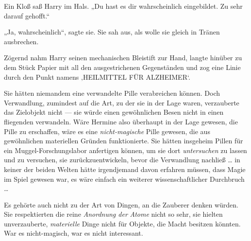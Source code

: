 Ein Kloß saß Harry im Hals.
„Du hast es dir wahrscheinlich eingebildet. Zu sehr darauf gehofft.“

„Ja, wahrscheinlich“, sagte sie. Sie sah aus, als wolle sie gleich in Tränen ausbrechen.

Zögernd nahm Harry seinen mechanischen Bleistift zur Hand, langte hinüber zu dem Stück Papier mit all den ausgestrichenen Gegenständen und zog eine Linie durch den Punkt namens ‚HEILMITTEL FÜR ALZHEIMER‘.

Sie hätten niemandem eine verwandelte Pille verabreichen können. Doch Verwandlung, zumindest auf die Art, zu der sie in der Lage waren, verzauberte das Zielobjekt nicht — sie würde einen gewöhnlichen Besen nicht in einen fliegenden verwandeln. Wäre Hermine also überhaupt in der Lage gewesen, die Pille zu erschaffen, wäre es eine \emph{nicht-magische} Pille gewesen, die aus gewöhnlichen materiellen Gründen funktionierte. Sie hätten insgeheim Pillen für ein Muggel-Forschungslabor anfertigen können, um sie dort \emph{untersuchen} zu lassen und zu versuchen, sie zurückzuentwickeln, bevor die Verwandlung nachließ … in keiner der beiden Welten hätte irgendjemand davon erfahren müssen, dass Magie im Spiel gewesen war, es wäre einfach ein weiterer wissenschaftlicher Durchbruch …

Es gehörte auch nicht zu der Art von Dingen, an die Zauberer denken würden. Sie respektierten die reine \emph{Anordnung der} \emph{Atome} nicht so sehr, sie hielten unverzauberte, \emph{materielle} Dinge nicht für Objekte, die Macht besitzen könnten. War es nicht-magisch, war es nicht interessant.

